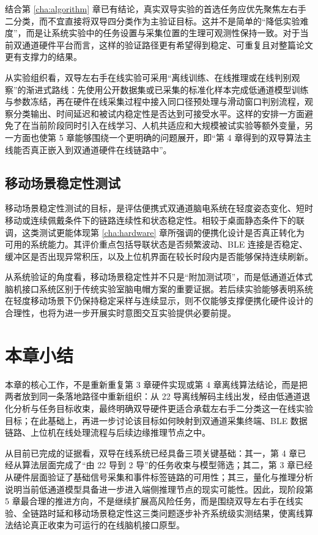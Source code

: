 结合第 \ref{cha:algorithm} 章已有结论，真实双导实验的首选任务应优先聚焦左右手二分类，而不宜直接将双导四分类作为主验证目标。这并不是简单的“降低实验难度”，而是让系统实验中的任务设置与采集位置的生理可观测性保持一致。对于当前双通道硬件平台而言，这样的验证路径更有希望得到稳定、可重复且对整篇论文更有支撑力的结果。

从实验组织看，双导左右手在线实验可采用“离线训练、在线推理或在线判别观察”的渐进式路线：先使用公开数据集或已采集的标准化样本完成低通道模型训练与参数冻结，再在硬件在线采集过程中接入同口径预处理与滑动窗口判别流程，观察分类输出、时间延迟和被试内稳定性是否达到可接受水平。这样的安排一方面避免了在当前阶段同时引入在线学习、人机共适应和大规模被试实验等额外变量，另一方面也使第 5 章能够围绕一个更明确的问题展开，即“第 4 章得到的双导算法主线能否真正嵌入到双通道硬件在线链路中”。

\subsection{移动场景稳定性测试}

移动场景稳定性测试的目标，是评估便携式双通道脑电系统在轻度姿态变化、短时移动或连续佩戴条件下的链路连续性和状态稳定性。相较于桌面静态条件下的联调，这类测试更能体现第 \ref{cha:hardware} 章所强调的便携化设计是否真正转化为可用的系统能力。其评价重点包括导联状态是否频繁波动、BLE 连接是否稳定、缓冲区是否出现异常积压，以及上位机界面在较长时段内是否能够保持连续刷新。

从系统验证的角度看，移动场景稳定性并不只是“附加测试项”，而是低通道近体式脑机接口系统区别于传统实验室脑电帽方案的重要证据。若后续实验能够表明系统在轻度移动场景下仍保持稳定采样与连续显示，则不仅能够支撑便携化硬件设计的合理性，也将为进一步开展实时意图交互实验提供必要前提。

\section{本章小结}

本章的核心工作，不是重新重复第 3 章硬件实现或第 4 章离线算法结论，而是把两者放到同一条落地路径中重新组织：从 22 导离线解码主线出发，经由低通道退化分析与任务目标收束，最终明确双导硬件更适合承载左右手二分类这一在线实验目标；在此基础上，再进一步讨论该目标如何映射到双通道采集终端、BLE 数据链路、上位机在线处理流程与后续边缘推理节点之中。

从目前已完成的证据看，双导在线系统已经具备三项关键基础：其一，第 4 章已经从算法层面完成了“由 22 导到 2 导”的任务收束与模型筛选；其二，第 3 章已经从硬件层面验证了基础信号采集和事件标签链路的可用性；其三，量化与推理分析说明当前低通道模型具备进一步进入端侧推理节点的现实可能性。因此，现阶段第 5 章最合理的推进方向，不是继续扩展高风险任务，而是围绕双导左右手在线实验、全链路时延和移动场景稳定性这三类问题逐步补齐系统级实测结果，使离线算法结论真正收束为可运行的在线脑机接口原型。
